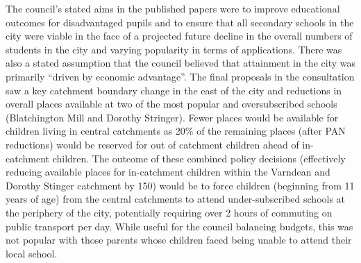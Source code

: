 \documentclass[
  11pt,
]{article}
\begin{document}
The council's stated aims in the published papers were to improve
educational outcomes for disadvantaged pupils and to ensure that all
secondary schools in the city were viable in the face of a projected
future decline in the overall numbers of students in the city and
varying popularity in terms of applications. There was also a stated
assumption that the council believed that attainment in the city was
primarily ``driven by economic advantage''. The final proposals in the
consultation saw a key catchment boundary change in the east of the city
and reductions in overall places available at two of the most popular
and oversubscribed schools (Blatchington Mill and Dorothy Stringer).
Fewer places would be available for children living in central
catchments as 20\% of the remaining places (after PAN reductions) would
be reserved for out of catchment children ahead of in-catchment
children. The outcome of these combined policy decisions (effectively
reducing available places for in-catchment children within the Varndean
and Dorothy Stinger catchment by 150) would be to force children
(beginning from 11 years of age) from the central catchments to attend
under-subscribed schools at the periphery of the city, potentially
requiring over 2 hours of commuting on public transport per day. While
useful for the council balancing budgets, this was not popular with
those parents whose children faced being unable to attend their local
school.
\end{document}
